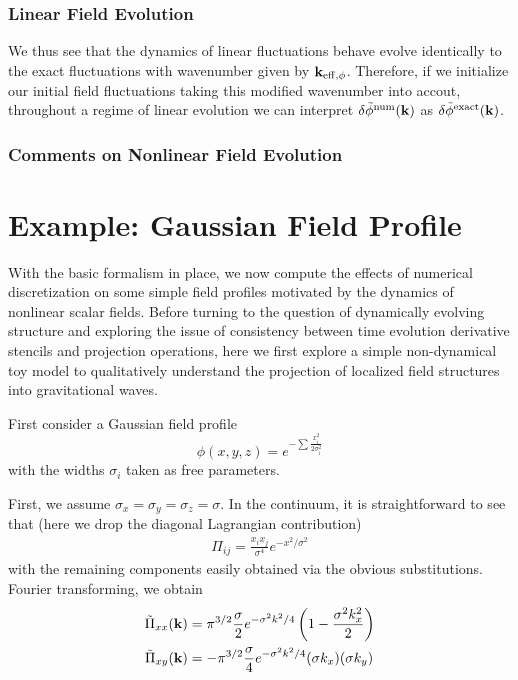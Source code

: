 \documentclass{revtex4}
\begin{document}
\subsubsection{Linear Field Evolution}
We thus see that the dynamics of linear fluctuations behave evolve identically to the exact fluctuations with wavenumber given by ${\bf k}_{{\rm eff},\phi}$.
Therefore, if we initialize our initial field fluctuations taking this modified wavenumber into accout, throughout a regime of linear evolution we can interpret $\delta\tilde{\phi}^{\rm num}({{\bf k}})$ as $\delta\tilde{\phi}^{\rm exact}({{\bf k}})$.

\subsubsection{Comments on Nonlinear Field Evolution}


\section{Example: Gaussian Field Profile}
With the basic formalism in place, we now compute the effects of numerical discretization on some simple field profiles motivated by the dynamics of nonlinear scalar fields.
Before turning to the question of dynamically evolving structure and exploring the issue of consistency between time evolution derivative stencils and projection operations,
here we first explore a simple non-dynamical toy model to qualitatively understand the projection of localized field structures into gravitational waves.

First consider a Gaussian field profile
\begin{equation}
  \phi(x,y,z) = e^{-\sum\frac{x_i^2}{2\sigma_i^2}}
\end{equation}
with the widths $\sigma_i$ taken as free parameters.

First, we assume $\sigma_x=\sigma_y=\sigma_z=\sigma$.
In the continuum, it is straightforward to see that (here we drop the diagonal Lagrangian contribution)
\begin{subequations}
\begin{align}
  \Pi_{ij} = \frac{x_ix_j}{\sigma^4}e^{-x^2/\sigma^2}
\end{align}
\end{subequations}
with the remaining components easily obtained via the obvious substitutions.
Fourier transforming, we obtain
\begin{align}
  \tilde{\Pi}_{xx}({\bf k}) &= \pi^{3/2}\frac{\sigma}{2}e^{-\sigma^2k^2/4}\left(1-\frac{\sigma^2k_x^2}{2}\right) \\
  \tilde{\Pi}_{xy}({\bf k}) &= -\pi^{3/2}\frac{\sigma}{4}e^{-\sigma^2k^2/4}(\sigma k_x)(\sigma k_y)
\end{align}
\end{document}
